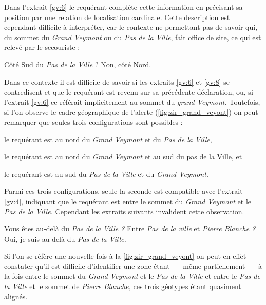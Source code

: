 Dans l'extrait \ref{gv:6} le requérant complète cette information en
précisant sa position par une relation de localisation
cardinale. Cette description est cependant difficile à interpréter,
car le contexte ne permettant pas de savoir qui, du sommet du
\emph{Grand Veymont} ou du \emph{Pas de la Ville}, fait office de
site, ce qui est relevé par le secouriste :
%
\begin{dialogue}
  \Sec {} Côté Sud du \emph{Pas de la Ville} ?
%
  \Req {} Non, côté Nord.
\end{dialogue}
%
Dans ce contexte il est difficile de savoir si les extraits \ref{gv:6}
et \ref{gv:8} se contredisent et que le requérant est revenu sur sa
précédente déclaration, ou, si l'extrait \ref{gv:6} ce référait
implicitement au sommet du \emph{grand Veymont.} Toutefois, si l'on
observe le cadre géographique de l'alerte
(\autoref{fig:zir_grand_veyont}) on peut remarquer que seules trois
configurations sont possibles :
%
\begin{enumerate*}[label=(\arabic*)]
\item le requérant est au nord du \emph{Grand Veymont} et du \emph{Pas
    de la Ville},
\item le requérant est au nord du \emph{Grand Veymont} et au sud du
  pas de la Ville, et
\item le requérant est au sud du \emph{Pas de la Ville} et du
  \emph{Grand Veymont.}
\end{enumerate*}
%
Parmi ces trois configurations, seule la seconde est compatible avec
l'extrait \ref{gv:4}, indiquant que le requérant est entre le sommet
du \emph{Grand Veymont} et le \emph{Pas de la Ville.} Cependant les
extraits suivants invalident cette observation.
%
\begin{dialogue}
  \Sec {} Vous êtes au-delà du \emph{Pas de la Ville ?}
   Entre \emph{Pas de la ville} et \emph{Pierre
    Blanche ?}
  \Req {} Oui, je suis au-delà du \emph{Pas de la
    Ville.}
\end{dialogue}
%
Si l'on se réfère une nouvelle fois à la
\autoref{fig:zir_grand_veyont} on peut en effet constater qu'il est
difficile d'identifier une zone étant ---~même partiellement~--- à la
fois entre le sommet du \emph{Grand Veymont} et le \emph{Pas de la
  Ville} et entre le \emph{Pas de la Ville} et le sommet de
\emph{Pierre Blanche,} ces trois géotypes étant quasiment alignés.

